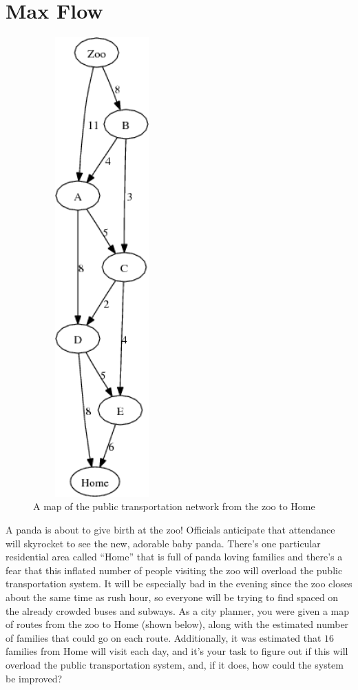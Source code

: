 \documentclass{article}
\begin{document}
\section*{Max Flow}

\begin{figure}
\begin{center}
 \includegraphics[width=150pt,height=500pt]{MaxFlow.png}
\end{center}
\caption{A map of the public transportation network from the zoo to Home}
\end{figure} 

A panda is about to give birth at the zoo!  Officials anticipate that attendance will skyrocket to see the new, adorable baby panda.  There's one particular residential area called ``Home'' that is full of panda loving families and there's a fear that this inflated number of people visiting the zoo will overload the public transportation system.  It will be especially bad in the evening since the zoo closes about the same time as rush hour, so everyone will be trying to find spaced on the already crowded buses and subways.  As a city planner, you were given a map of routes from the zoo to Home (shown below), along with the estimated number of families that could go on each route.  Additionally, it was estimated that $16$ families from Home will visit each day, and it's your task to figure out if this will overload the public transportation system, and, if it does, how could the system be improved?
\end{document}
